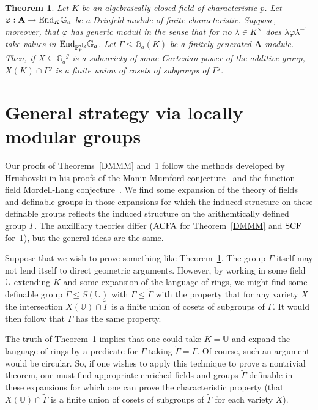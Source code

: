 \documentclass{amsart}
\newcommand{\ACFA}{{\rm ACFA}}
\newcommand{\SCF}{{\rm SCF}}
\newcommand{\Ga}{{{\mathbb G}_a}}
\newcommand{\FF}{{\mathbb F}}
\newcommand{\UU}{{\mathbb U}}
\newcommand{\alg}{{\rm alg}}
\newtheorem{thm}{Theorem}[section]
\theoremstyle{definition}
\theoremstyle{remark}
\begin{document}
\begin{thm}
\label{wDML}
Let $K$ be an algebraically closed field of characteristic $p$. 
Let $\varphi:{\mathbf A} \to {\rm End}_K \Ga$ be a Drinfeld 
module of \emph{finite} characteristic.  Suppose, moreover, that $\varphi$ has 
generic moduli in the sense that for no $\lambda \in K^\times$ does
$\lambda \varphi \lambda^{-1}$ take values in ${\rm End}_{\FF_p^\alg} \Ga$.
Let $\Gamma \leq \Ga(K)$ be a finitely generated ${\mathbf A}$-module. 
Then, if $X \subseteq \Ga^g$ is a subvariety of some Cartesian power of the additive group, 
$X(K) \cap \Gamma^g$ is a finite union of cosets of subgroups of $\Gamma^g$.
\end{thm}

\section{General strategy via locally modular groups}
\label{LM}

Our proofs of Theorems~\ref{DMMM} and~\ref{wDML} follow the methods developed by
Hrushovski in his proofs of the Manin-Mumford conjecture~\cite{HrMM} and 
the function field Mordell-Lang conjecture~\cite{HrML}.  We find some expansion 
of the theory of fields and definable groups in those expansions for which the 
induced structure on these definable groups reflects the induced structure on 
the arithemtically defined group $\Gamma$.  The auxilliary theories differ ($\ACFA$ 
for Theorem~\ref{DMMM} and $\SCF$ for~\ref{wDML}), but the general ideas
are the same.

Suppose that we wish to prove something like Theorem~\ref{wDML}.  The group 
$\Gamma$ itself may not lend itself to direct geometric arguments.  However,
by working in some field $\UU$ extending $K$ and  some expansion of the
language of rings, we might find some definable group $\widetilde{\Gamma} \leq 
S(\UU)$ with $\Gamma \leq \widetilde{\Gamma}$ with the property that
for any variety $X$ the intersection $X(\UU) \cap \widetilde{\Gamma}$ is 
a finite union of cosets of subgroups of $\Gamma$.  It would then follow
that $\Gamma$ has the same property.

The truth of Theorem~\ref{wDML} implies that one could take $K = \UU$ and 
expand the language of rings by a predicate for $\Gamma$ taking 
$\widetilde{\Gamma} = \Gamma$.  Of course, such an argument would be circular.  So,
if one wishes to apply this technique to prove a nontrivial theorem, one must find
appropriate enriched fields and groups $\widetilde{\Gamma}$ 
definable in these expansions for which 
one can prove the characteristic property (that $X(\UU) \cap \widetilde{\Gamma}$
is a finite union of cosets of subgroups of $\widetilde{\Gamma}$ for each 
variety $X$). 
\end{document}
